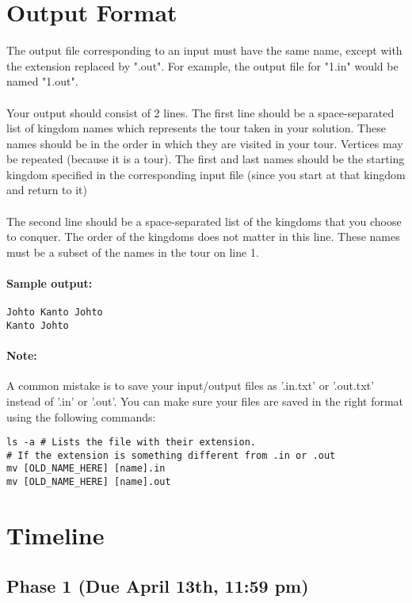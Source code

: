 \documentclass{article}
\begin{document}
\section*{Output Format}
The output file corresponding to an input must have the same name, except with the extension replaced by ".out". For example, the output file for "1.in" would be named "1.out".
\\ \\
Your output should consist of 2 lines. The first line should be a space-separated list of kingdom names which represents the tour taken in your solution. These names should be in the order in which they are visited in your tour. Vertices may be repeated (because it is a tour). The first and last names should be the starting kingdom specified in the corresponding input file (since you start at that kingdom and return to it)
\\ \\
The second line should be a space-separated list of the kingdoms that you choose to conquer. The order of the kingdoms does not matter in this line. These names must be a subset of the names in the tour on line 1.

\paragraph{Sample output:}
\begin{verbatim}
Johto Kanto Johto
Kanto Johto
\end{verbatim}

\paragraph{Note:} A common mistake is to save your input/output files as '.in.txt' or '.out.txt' instead of '.in' or '.out'. You can make sure your files are saved in the right format using the following commands:

\begin{verbatim}
ls -a # Lists the file with their extension. 
# If the extension is something different from .in or .out
mv [OLD_NAME_HERE] [name].in
mv [OLD_NAME_HERE] [name].out
\end{verbatim}

\newpage
\section*{Timeline}

\subsection*{Phase 1 (Due April 13th, 11:59 pm)}
\end{document}
